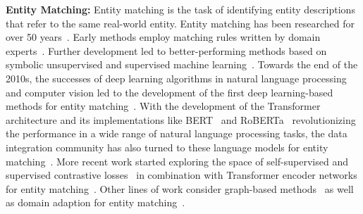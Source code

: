 \documentclass[sigconf,edbt]{acmart-edbt2024}
\begin{document}
\textbf{Entity Matching:}
Entity matching \cite{christophides_end--end_2020,BarlaugNeural2021,Christen2012DataMC,elmagarmidDuplicateRecordDetection2007} is the task of identifying entity descriptions that refer to the same real-world entity. Entity matching has been researched for over 50 years~\cite{fellegiTheoryRecordLinkage1969}. Early methods employ matching rules written by domain experts~\cite{fellegiTheoryRecordLinkage1969}. Further development led to better-performing methods based on symbolic unsupervised and supervised machine learning~\cite{christophides_end--end_2020}. 
Towards the end of the 2010s, the successes of deep learning algorithms in natural language processing and computer vision led to the development of the first deep learning-based methods for entity matching~\cite{mudgalDeepLearningEntity2018,shahNeuralNetworkBased2018}.
With the development of the Transformer~\cite{vaswaniAttentionAllYou2017} architecture and its implementations like BERT~\cite{devlinBERTPretrainingDeep2019} and RoBERTa~\cite{liu_roberta_2019} revolutionizing the performance in a wide range of natural language processing tasks, the data integration community has also turned to these language models for entity matching~\cite{brunnerEntityMatchingTransformer2020,liDeepEntityMatching2020,peetersDualobjectiveFinetuningBERT2021,yaoEntityResolutionHierarchical2022}.
More recent work started exploring the space of self-supervised and supervised contrastive losses~\cite{chenSimpleFrameworkContrastive2020,gaoSimCSESimpleContrastive2021,khoslaSupervisedContrastiveLearning2021} in combination with Transformer encoder networks for entity matching~\cite{peetersSupervisedContrastiveLearning2022a,wangSudowoodoContrastiveSelfsupervised2022}.
Other lines of  work consider graph-based methods~\cite{geCollaborERSelfsupervisedEntity2021,yaoEntityResolutionHierarchical2022} as well as domain adaption for entity matching~\cite{losterKnowledgeTransferEntity2021,trabelsiDAMEDomainAdaptation2022,tuDomainAdaptationDeep2022,akbarianrastaghiProbingRobustnessPretrained2022}.
\end{document}
